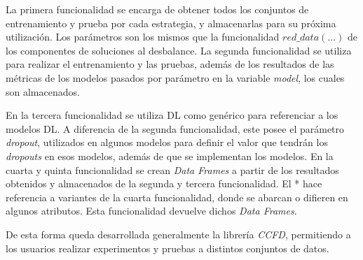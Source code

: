   La primera funcionalidad se encarga de obtener todos los conjuntos de entrenamiento y prueba por cada estrategia, y almacenarlas para su pr\'{o}xima utilizaci\'{o}n. Los par\'{a}metros son los mismos que la funcionalidad $red\_data(\dots)$ de los componentes de soluciones al desbalance. La segunda funcionalidad se utiliza para realizar el entrenamiento y las pruebas, adem\'{a}s de los resultados de las m\'{e}tricas de los modelos pasados por par\'{a}metro en la variable \textit{model}, los cuales son almacenados.
  
  En la tercera funcionalidad se utiliza DL como gen\'{e}rico para referenciar a los modelos DL. A diferencia de la segunda funcionalidad, este posee el par\'{a}metro \textit{dropout}, utilizados en algunos modelos para definir el valor que tendr\'{a}n los \textit{dropouts} en esos modelos, adem\'{a}s de que se implementan los modelos. En la cuarta y quinta funcionalidad se crean \textit{Data Frames} a partir de los resultados obtenidos y almacenados de la segunda y tercera funcionalidad. El * hace referencia a variantes de la cuarta funcionalidad, donde se abarcan o difieren en algunos atributos. Esta funcionalidad devuelve dichos \textit{Data Frames}.
  
  De esta forma queda desarrollada generalmente la librer\'{i}a \textit{CCFD}, permitiendo a los usuarios realizar experimentos y pruebas a distintos conjuntos de datos.
  